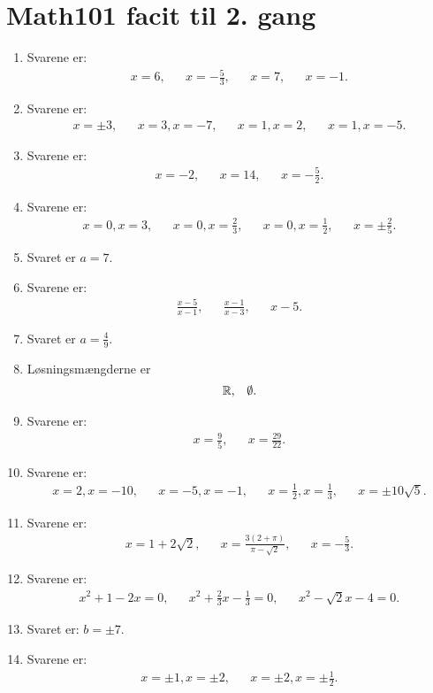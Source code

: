 \newpage
\section{Math101 facit til 2. gang}
\begin{enumerate}
\item Svarene er:
\begin{align*}
x=6,&& x=-\frac{5}{3},&&x=7,&& x=-1.
\end{align*}

\item Svarene er:
\begin{align*}
x=\pm 3,&&x=3,x=-7,&& x=1,x=2,&& x=1,x=-5.
\end{align*}

\item Svarene er:
\begin{align*}
x=-2,&& x=14,&& x=-\frac{5}{2}.
\end{align*}

\item Svarene er:
\begin{align*}
x=0,x=3,&& x=0,x=\frac{2}{3},&& x=0,x=\frac{1}{2},&& x=\pm \frac{2}{5}.
\end{align*}

\item Svaret er $a=7$.

\item Svarene er:
\begin{align*}
\frac{x-5}{x-1},&&\frac{x-1}{x-3},&& x-5.
\end{align*}

\item Svaret er $a=\frac{4}{9}$.

\item Løsningsmængderne er
\begin{align*}
\mathbb{R},&& \emptyset.
\end{align*}


\item Svarene er:
\begin{align*}
x=\frac{9}{5},&& x=\frac{29}{22}.
\end{align*}

\item Svarene er:
\begin{align*}
x=2,x=-10,&& x=-5,x=-1,&&x=\frac{1}{2},x=\frac{1}{3},&& x=\pm 10\sqrt{5}.
\end{align*}



\item Svarene er:
\begin{align*}
x=1+2\sqrt{2},&& x=\frac{3(2+\pi)}{\pi-\sqrt{2}},&& x=-\frac{5}{3}.
\end{align*}

	\item Svarene er:
	\begin{align*}
	x^2+1-2x=0,&& x^2+\frac{2}{3}x-\frac{1}{3}=0,&&  x^2-\sqrt{2}x-4=0.
	\end{align*}
	
	
	\item Svaret er: $b=\pm 7$. 
	
	\item Svarene er:
	\begin{align*}
	x=\pm1,x=\pm 2,&& x=\pm 2,x=\pm \frac{1}{2}.
	\end{align*}

	

	
\end{enumerate}